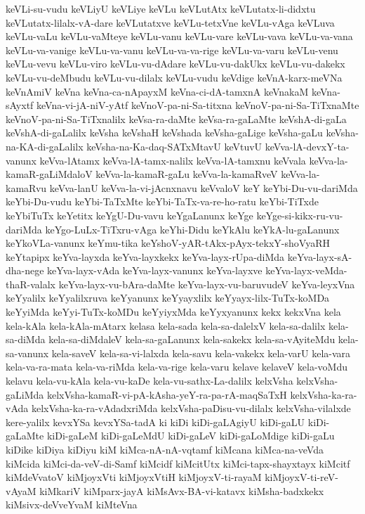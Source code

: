 {keVLi-su-vudu
keVLiyU
keVLiye
keVLu
keVLutAtx
keVLutatx-li-didxtu
keVLutatx-lilalx-vA-dare
keVLutatxve
keVLu-tetxVne
keVLu-vAga
keVLuva
keVLu-vaLu
keVLu-vaMteye
keVLu-vanu
keVLu-vare
keVLu-vava
keVLu-va-vana
keVLu-va-vanige
keVLu-va-vanu
keVLu-va-va-rige
keVLu-va-varu
keVLu-venu
keVLu-vevu
keVLu-viro
keVLu-vu-dAdare
keVLu-vu-dakUkx
keVLu-vu-dakekx
keVLu-vu-deMbudu
keVLu-vu-dilalx
keVLu-vudu
keVdige
keVnA-karx-meVNa
keVnAmiV
keVna
keVna-ca-nApayxM
keVna-ci-dA-tamxnA
keVnakaM
keVna-sAyxtf
keVna-vi-jA-niV-yAtf
keVnoV-pa-ni-Sa-titxna
keVnoV-pa-ni-Sa-TiTxnaMte
keVnoV-pa-ni-Sa-TiTxnalilx
keVsa-ra-daMte
keVsa-ra-gaLaMte
keVshA-di-gaLa
keVshA-di-gaLalilx
keVsha
keVshaH
keVshada
keVsha-gaLige
keVsha-gaLu
keVsha-na-KA-di-gaLalilx
keVsha-na-Ka-daq-SATxMtavU
keVtuvU
keVva-lA-devxY-ta-vanunx
keVva-lAtamx
keVva-lA-tamx-nalilx
keVva-lA-tamxnu
keVvala
keVva-la-kamaR-gaLiMdaloV
keVva-la-kamaR-gaLu
keVva-la-kamaRveV
keVva-la-kamaRvu
keVva-lanU
keVva-la-vi-jAcnxnavu
keVvaloV
keY
keYbi-Du-vu-dariMda
keYbi-Du-vudu
keYbi-TaTxMte
keYbi-TaTx-va-re-ho-ratu
keYbi-TiTxde
keYbiTuTx
keYetitx
keYgU-Du-vavu
keYgaLanunx
keYge
keYge-si-kikx-ru-vu-dariMda
keYgo-LuLx-TiTxru-vAga
keYhi-Didu
keYkAlu
keYkA-lu-gaLanunx
keYkoVLa-vanunx
keYmu-tika
keYshoV-yAR-tAkx-pAyx-tekxY-shoVyaRH
keYtapipx
keYva-layxda
keYva-layxkekx
keYva-layx-rUpa-diMda
keYva-layx-sA-dha-nege
keYva-layx-vAda
keYva-layx-vanunx
keYva-layxve
keYva-layx-veMda-thaR-valalx
keYva-layx-vu-bAra-daMte
keYva-layx-vu-baruvudeV
keYva-leyxVna
keYyalilx
keYyalilxruva
keYyanunx
keYyayxlilx
keYyayx-lilx-TuTx-koMDa
keYyiMda
keYyi-TuTx-koMDu
keYyiyxMda
keYyxyanunx
kekx
kekxVna
kela
kela-kAla
kela-kAla-mAtarx
kelasa
kela-sada
kela-sa-dalelxV
kela-sa-dalilx
kela-sa-diMda
kela-sa-diMdaleV
kela-sa-gaLanunx
kela-sakekx
kela-sa-vAyiteMdu
kela-sa-vanunx
kela-saveV
kela-sa-vi-lalxda
kela-savu
kela-vakekx
kela-varU
kela-vara
kela-va-ra-mata
kela-va-riMda
kela-va-rige
kela-varu
kelave
kelaveV
kela-voMdu
kelavu
kela-vu-kAla
kela-vu-kaDe
kela-vu-sathx-La-dalilx
kelxVsha
kelxVsha-gaLiMda
kelxVsha-kamaR-vi-pA-kAsha-yeY-ra-pa-rA-maqSaTxH
kelxVsha-ka-ra-vAda
kelxVsha-ka-ra-vAdadxriMda
kelxVsha-paDisu-vu-dilalx
kelxVsha-vilalxde
kere-yalilx
kevxYSa
kevxYSa-tadA
ki
kiDi
kiDi-gaLAgiyU
kiDi-gaLU
kiDi-gaLaMte
kiDi-gaLeM
kiDi-gaLeMdU
kiDi-gaLeV
kiDi-gaLoMdige
kiDi-gaLu
kiDike
kiDiya
kiDiyu
kiM
kiMca-nA-nA-vqtamf
kiMcana
kiMca-na-veVda
kiMcida
kiMci-da-veV-di-Samf
kiMcidf
kiMcitUtx
kiMci-tapx-shayxtayx
kiMcitf
kiMdeVvatoV
kiMjoyxVti
kiMjoyxVtiH
kiMjoyxV-ti-rayaM
kiMjoyxV-ti-reV-vAyaM
kiMkariV
kiMparx-jayA
kiMsAvx-BA-vi-katavx
kiMsha-badxkekx
kiMsivx-deVveYvaM
kiMteVna
}
